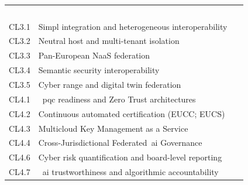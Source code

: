 \documentclass{ieeeaccess}
\begin{document}
\begin{table}[t]
\begin{tabularx}{\textwidth}{@{}lXl@{}}
  &~\cite{mitre2020,enisaetl2025} \\
CL3.1 & Simpl integration and heterogeneous interoperability
  &~\cite{ecsimpl,oascmim5,etsingsild} \\
CL3.2 & Neutral host and multi-tenant isolation
  &~\cite{rose2020zta,chandramouli2023zta} \\
CL3.3 & Pan-European NaaS federation
  &~\cite{camara2025,eudna2026} \\
CL3.4 & Semantic security interoperability
  &~\cite{oascmim5,etsingsild} \\
CL3.5 & Cyber range and digital twin federation
  &~\cite{eucsa,concordia2022,ecroadmap2024} \\
CL4.1 &~\acrfull{pqc} readiness and Zero Trust architectures
  &~\cite{rose2020zta,chandramouli2023zta,nistfips203,nistfips204,nistfips205} \\
CL4.2 & Continuous automated certification (EUCC; EUCS)
  &~\cite{commreg2024eucc,eucsa,oscal2024,iorga2024oscal} \\
CL4.3 & Multicloud Key Management as a Service
  &~\cite{rose2020zta,chandramouli2023zta,nistfips203,nistfips204,nistfips205} \\
CL4.4 & Cross-Jurisdictional Federated~\gls{ai} Governance
  &~\cite{eugdpr,ccc2022,eudataact} \\
CL4.6 & Cyber risk quantification and board-level reporting
  &~\cite{eunis2,eudora,nistcsf2} \\
CL4.7 &~\gls{ai} trustworthiness and algorithmic accountability
  &~\cite{euaiact,nistairmf,nistaigenai} \\
\bottomrule
\end{tabularx}
\end{table}

\EOD
\end{document}
